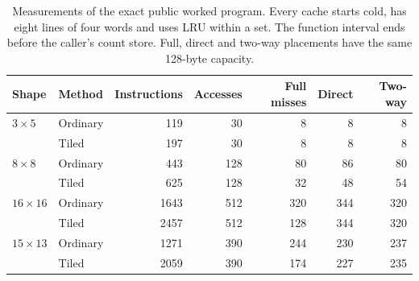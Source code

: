 \begin{table}[htbp]
  \centering
  \small
  \setlength{\tabcolsep}{8pt}
  \begin{tabular}{llrrrrr}
    \toprule
    Shape        & Method   & Instructions & Accesses & Full misses & Direct & Two-way \\
    \midrule
    $3\times5$   & Ordinary & 119          & 30       & 8           & 8      & 8       \\
                 & Tiled    & 197          & 30       & 8           & 8      & 8       \\
    $8\times8$   & Ordinary & 443          & 128      & 80          & 86     & 80      \\
                 & Tiled    & 625          & 128      & 32          & 48     & 54      \\
    $16\times16$ & Ordinary & 1643         & 512      & 320         & 344    & 320     \\
                 & Tiled    & 2457         & 512      & 128         & 344    & 320     \\
    $15\times13$ & Ordinary & 1271         & 390      & 244         & 230    & 237     \\
                 & Tiled    & 2059         & 390      & 174         & 227    & 235     \\
    \bottomrule
  \end{tabular}
  \caption{Measurements of the exact public worked program. Every cache starts cold, has eight lines of four words and uses LRU within a set. The function interval ends before the caller's count store. Full, direct and two-way placements have the same 128-byte capacity.}
  \label{tab:revision-locality-measurements}
\end{table}
